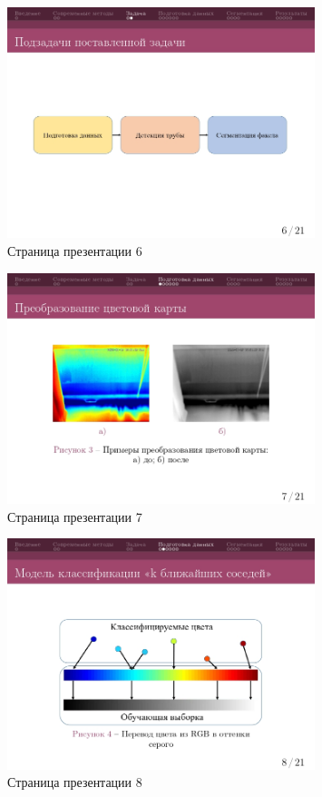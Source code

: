\documentclass[14pt, a4paper]{extreport}
\begin{document}
	\begin{figure}[h!]
		\centering
		\includegraphics[width = 0.8\textwidth]{image/процентовка1_page-0006}	
		\caption{Страница презентации 6}
	\end{figure}
	\begin{figure}[h!]
		\centering
		\includegraphics[width = 0.8\textwidth]{image/процентовка1_page-0007}	
		\caption{Страница презентации 7}
	\end{figure}
	\begin{figure}[h!]
		\centering
		\includegraphics[width = 0.8\textwidth]{image/процентовка1_page-0008}	
		\caption{Страница презентации 8}
	\end{figure}
\end{document}
